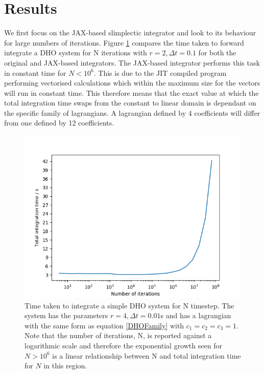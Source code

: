\documentclass[10pt]{iopart}
\begin{document}
\section{Results}

We first focus on the JAX-based slimplectic integrator and look to its behaviour for large numbers of iterations. Figure \ref{fig:nplot} compares the time taken to forward integrate a DHO system for N iterations with $r=2, \Delta t = 0.1$ for both the original and JAX-based integrators. The JAX-based integrator performs this task in constant time for $N<10^6$. This is due to the JIT compiled program performing vectorised calculations which within the maximum size for the vectors will run in constant time. This therefore means that the exact value at which the total integration time swaps from the constant to linear domain is dependant on the specific family of lagrangians. A lagrangian defined by 4 coefficients will differ from one defined by 12 coefficients. 

\begin{figure}
	\label{fig:nplot}
	\centering
	\includegraphics[width=\columnwidth]{NPlot.jpg}
	\caption{Time taken to integrate a simple DHO system for N timestep. The system has the parameters $r=4, \Delta t=0.01$s and has a lagrangian with the same form as equation \ref{DHOFamily} with $c_1=c_2=c_3=1$. Note that the number of iterations, N, is reported against a logarithmic scale and therefore the exponential growth seen for $N>10^6$ is a linear relationship between N and total integration time for $N$ in this region.}
\end{figure}
\end{document}
